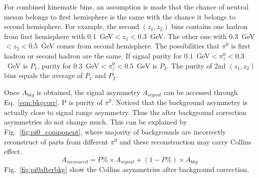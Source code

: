 For combined kinematic bins, an assumption is made that the chance of neutral meson belongs to first hemisphere is the same with the chance it belongs to second hemisphere. For example, the second $(z_1,z_2)$ bins contains one hadron from first hemisphere with $0.1$~GeV$<z_1<0.3$~GeV. The other one with $0.3$~GeV$<z_2<0.5$~GeV comes from second hemisphere. The possibilities that $\pi^0$ is first hadron or second hadron are the same. If signal purity for $0.1$~GeV$<\pi^0_z<0.3$~GeV is $P_1$, purity for $0.3$~GeV$<\pi^0_z<0.5$~GeV is $P_2$. The purity of 2nd $(z_1,z_2)$ bins equals the average of $P_1$ and $P_2$. 

Once $A_{bkg}$ is obtained, the signal asymmetry $A_{signal}$ can be accessed through Eq.~\eqref{eqn:bkgcorr}. P is purity of $\pi^0$. Noticed that the background asymmetry is actually close to signal range asymmetry. Thus the after background correction asymmetries do not change much. This can be explained by Fig.~\ref{fig:pi0_component}, where majority of backgrounds are incorrectly reconstruct of parts from different $\pi^0$ and these reconstruction may carry Collins effect.
\begin{equation}
A_{measured}=P\%\times A_{signal}+(1-P\%)\times A_{bkg}
\label{eqn:bkgcorr}
\end{equation}
Fig.~\ref{fig:pi0afterbkg} show the Collins asymmetries after background correction.

